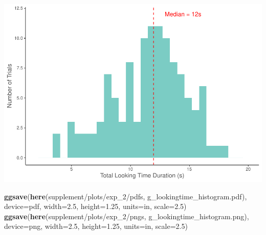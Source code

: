 \documentclass[
  doc,floatsintext]{apa6}
\newenvironment{Shaded}{\begin{snugshade}}{\end{snugshade}}
\newcommand{\AttributeTok}[1]{\textcolor[rgb]{0.13,0.29,0.53}{#1}}
\newcommand{\FloatTok}[1]{\textcolor[rgb]{0.00,0.00,0.81}{#1}}
\newcommand{\FunctionTok}[1]{\textcolor[rgb]{0.13,0.29,0.53}{\textbf{#1}}}
\newcommand{\NormalTok}[1]{#1}
\newcommand{\StringTok}[1]{\textcolor[rgb]{0.31,0.60,0.02}{#1}}
\begin{document}
\includegraphics{revised_ms_analyses_files/figure-latex/r2-g-durations-triallooking-1.pdf}

\begin{Shaded}
\begin{Highlighting}[]
\FunctionTok{ggsave}\NormalTok{(}\FunctionTok{here}\NormalTok{(}\StringTok{\textquotesingle{}supplement/plots/exp\_2/pdfs\textquotesingle{}}\NormalTok{, }\StringTok{\textquotesingle{}g\_lookingtime\_histogram.pdf\textquotesingle{}}\NormalTok{), }
       \AttributeTok{device=}\StringTok{\textquotesingle{}pdf\textquotesingle{}}\NormalTok{, }\AttributeTok{width=}\FloatTok{2.5}\NormalTok{, }\AttributeTok{height=}\FloatTok{1.25}\NormalTok{, }\AttributeTok{units=}\StringTok{\textquotesingle{}in\textquotesingle{}}\NormalTok{, }\AttributeTok{scale=}\FloatTok{2.5}\NormalTok{)}
\FunctionTok{ggsave}\NormalTok{(}\FunctionTok{here}\NormalTok{(}\StringTok{\textquotesingle{}supplement/plots/exp\_2/pngs\textquotesingle{}}\NormalTok{, }\StringTok{\textquotesingle{}g\_lookingtime\_histogram.png\textquotesingle{}}\NormalTok{),}
       \AttributeTok{device=}\StringTok{\textquotesingle{}png\textquotesingle{}}\NormalTok{, }\AttributeTok{width=}\FloatTok{2.5}\NormalTok{, }\AttributeTok{height=}\FloatTok{1.25}\NormalTok{, }\AttributeTok{units=}\StringTok{\textquotesingle{}in\textquotesingle{}}\NormalTok{, }\AttributeTok{scale=}\FloatTok{2.5}\NormalTok{)}
\end{Highlighting}
\end{Shaded}
\end{document}
